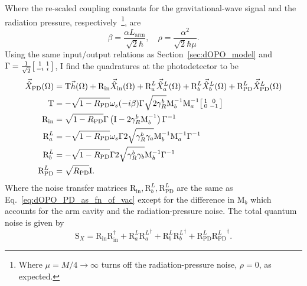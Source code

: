 Where the re-scaled coupling constants for the gravitational-wave signal and the radiation pressure, respectively~\footnote{Where $\mu=M/4\rightarrow\infty$ turns off the radiation-pressure noise, $\rho=0$, as expected.}, are
\begin{equation}\label{eq:beta_and_rho}
\beta = \frac{\alpha L_\mathrm{arm}}{\sqrt{2}\hbar},\quad \rho = \frac{\alpha^2}{\sqrt{2}\hbar\mu}.
\end{equation}
Using the same input/output relations as Section~\ref{sec:dOPO_model} and $\Gamma=\frac{1}{\sqrt2}\begin{bsmallmatrix}1 & 1 \\-i & i\end{bsmallmatrix}$, I find the quadratures at the photodetector to be
\begin{align}
\vec{\hat X}_\mathrm{PD}(\Omega)&=\text{T}\vec h(\Omega)+\text{R}_\text{in}\vec{\hat X}_\mathrm{in}(\Omega)+\text{R}^L_a\vec{\hat X}^L_a(\Omega)+\text{R}^L_b\vec{\hat X}^L_b(\Omega)+\text{R}^L_\text{PD}\vec{\hat X}^L_\text{PD}(\Omega)\\
\text{T}&=-\sqrt{1-R_\text{PD}}\omega_s(-i\beta)\Gamma \sqrt{2\gamma^b_R}\text{M}_b^{-1}\text{M}_a^{-1}\begin{bsmallmatrix}1 & 0 \\0 & -1\end{bsmallmatrix}\\
\text{R}_\text{in}&=\sqrt{1-R_\text{PD}}\Gamma\left(\text{I}-2\gamma^b_R\text{M}_b^{-1}\right)\Gamma^{-1}\\
\text{R}^L_a&=-\sqrt{1-R_\text{PD}}\omega_s\Gamma 2\sqrt{\gamma^b_R \gamma_a}\text{M}_b^{-1}\text{M}_a^{-1}\Gamma^{-1}\\
\text{R}^L_b&=-\sqrt{1-R_\text{PD}}\Gamma 2\sqrt{\gamma^b_R \gamma_b}\text{M}_b^{-1}\Gamma^{-1}\\
\text{R}^L_\text{PD}&=\sqrt{R_\text{PD}} \text{I}.
\end{align}
Where the noise transfer matrices $\text{R}_\text{in},\text{R}^L_b,\text{R}^L_\text{PD}$ are the same as Eq.~\ref{eq:dOPO_PD_as_fn_of_vac} except for the difference in $\text{M}_b$ which accounts for the arm cavity and the radiation-pressure noise. %
The total quantum noise is given by %
\begin{equation}
\text{S}_X=\text{R}_\text{in}\text{R}_\text{in}^\dag+\text{R}^L_a{\text{R}^L_a}^\dag+\text{R}^L_b{\text{R}^L_b}^\dag+\text{R}^L_\text{PD}{\text{R}^L_\text{PD}}^\dag.
\end{equation}
